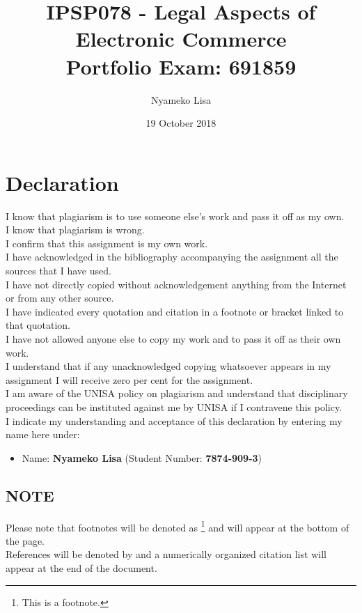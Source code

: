 \documentclass[11pt]{article}
\author{Nyameko Lisa}
\date{19 October 2018}
\title{IPSP078 - Legal Aspects of Electronic Commerce\\\medskip
\large Portfolio Exam: 691859}
\begin{document}
\maketitle
\addvspace{110pt}

\justifying
\addvspace{110pt}
\section*{Declaration}
\label{sec:org82f1fe6}
I know that plagiarism is to use someone else’s work and pass it off as my own.\\
I know that plagiarism is wrong.\\
I confirm that this assignment is my own work.\\
I have acknowledged in the bibliography accompanying the assignment all the sources that I have used.\\
I have not directly copied without acknowledgement anything from the Internet or from any other source.\\
I have indicated every quotation and citation in a footnote or bracket linked to that quotation.\\
I have not allowed anyone else to copy my work and to pass it off as their own work.\\
I understand that if any unacknowledged copying whatsoever appears in my assignment I will receive zero per cent for the assignment.\\
I am aware of the UNISA policy on plagiarism and understand that disciplinary proceedings can be instituted against me by UNISA if I contravene this policy.\\
I indicate my understanding and acceptance of this declaration by
entering my name here under:
\begin{itemize}
\item Name: \textbf{Nyameko Lisa} (Student Number: \textbf{7874-909-3})
\end{itemize}

\subsection*{NOTE}
\label{sec:org6c161d9}
Please note that footnotes will be denoted as \footnote{This is a footnote.} and will
appear at the bottom of the page.\\
References will be denoted by \cite{rsa02_elect_comm_trans_act} and a numerically
organized citation list will appear at the end of the document.
\newpage
\end{document}
